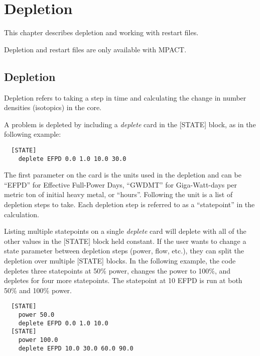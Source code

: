%
%
\chapter{Depletion}  \label{chap:depletion}

This chapter describes depletion and working with restart files.

Depletion and restart files are only available with MPACT.

\section{Depletion}

Depletion refers to taking a step in time and calculating the change in number densities (isotopics) in the core.

A problem is depleted by including a {\it deplete} card in the [STATE] block,
as in the following example:
\begin{verbatim}
  [STATE]
    deplete EFPD 0.0 1.0 10.0 30.0
\end{verbatim}
The first parameter on the card is the units used in the depletion and can be ``EFPD'' for Effective Full-Power Days,
``GWDMT'' for Giga-Watt-days per metric ton of initial heavy metal, or ``hours''.  
Following the unit is a list of depletion steps to take.  
Each depletion step is referred to as a ``statepoint'' in the calculation.

Listing multiple statepoints on a single {\it deplete} card will deplete with all of the other
values in the [STATE] block held constant.  If the user wants to change a state parameter between
depletion steps (power, flow, etc.), they can split the depletion over multiple [STATE] blocks.
In the following example, the code depletes three statepoints at 50\% power, changes the power
to 100\%, and depletes for four more statepoints.  The statepoint at 10 EFPD is run
at both 50\% and 100\% power.
\begin{verbatim}
  [STATE]
    power 50.0
    deplete EFPD 0.0 1.0 10.0
  [STATE]
    power 100.0
    deplete EFPD 10.0 30.0 60.0 90.0
\end{verbatim}


